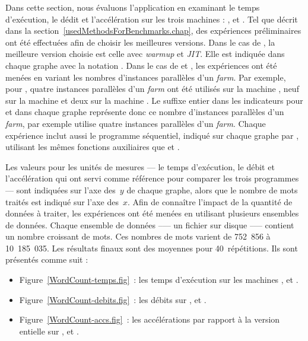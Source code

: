 Dans cette section, nous \'evaluons l'application  en examinant le temps d'ex\'ecution, le d\'edit et l'acc\'el\'eration sur les trois machines : ,  et . Tel que d\'ecrit dans la section~\ref{usedMethodsForBenchmarks.chap}, des exp\'eriences pr\'eliminaires ont \'et\'e effectu\'ees afin de choisir les meilleures versions. Dans le cas de , la meilleure version choisie est celle avec \emph{warmup} et \emph{JIT}. Elle est indiquée dans chaque graphe avec la notation . Dans le cas de  et , les exp\'eriences ont \'et\'e men\'ees en variant les nombres d'instances parall\`eles d'un \emph{farm}. Par exemple, pour , quatre instances parall\`eles d'un \emph{farm} ont \'et\'e utilis\'es sur la machine , neuf sur la machine  et deux sur la machine . Le suffixe entier dans les indicateurs pour  et  dans chaque graphe repr\'esente donc ce nombre d'instances parall\`eles d'un \emph{farm}, par exemple  utilise quatre instances parall\`eles d'un \emph{farm}. Chaque exp\'erience inclut aussi le programme s\'equentiel, indiqué sur chaque graphe par , utilisant  les m\^emes fonctions auxiliaires que  et .

Les valeurs pour les unit\'es de mesures --- le temps d'ex\'ecution, le d\'ebit et l'acc\'el\'eration qui ont servi comme r\'ef\'erence pour comparer les trois programmes --- sont indiqu\'ees sur l'axe des~$y$ de chaque graphe, alors que le nombre de mots trait\'es est indiqu\'e sur l'axe des~$x$. Afin de conna\^itre l'impact de la quantit\'e de donn\'ees \`a traiter, les exp\'eriences ont \'et\'e men\'ees en utilisant plusieurs ensembles de donn\'ees. Chaque ensemble de donn\'ees --— un fichier sur disque --— contient un nombre croissant de mots. Ces nombres de mots varient de 752~856 \`a 10~185~035. Les r\'esultats finaux sont des moyennes pour 40~r\'ep\'etitions. Ils sont pr\'esent\'es comme suit : 



\begin{itemize}

\item Figure~\ref{WordCount-temps.fig}~: les temps
d'ex\'ecution sur les machines ,  et .

\item Figure~\ref{WordCount-debits.fig}~: les débits sur ,  et .

\item Figure~\ref{WordCount-accs.fig}~: les accélérations
par rapport à la version entielle
sur ,  et .
\end{itemize}


